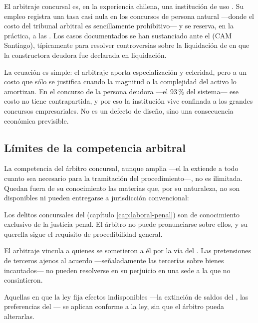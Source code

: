 El arbitraje concursal es, en la experiencia chilena, una institución de uso .
Su empleo registra una tasa casi nula en los concursos de persona natural ---donde el costo del
tribunal arbitral es sencillamente prohibitivo--- y se reserva, en la práctica, a las
. Los casos documentados se han
sustanciado ante el 
(CAM Santiago), típicamente para resolver controversias sobre la liquidación de
 en que la
constructora deudora fue declarada en liquidación.

\begin{foco}
La ecuación es simple: el arbitraje aporta especialización y celeridad, pero a un costo que sólo se
justifica cuando la magnitud o la complejidad del activo lo amortizan. En el concurso de la persona
deudora ---el 93\,\% del sistema--- ese costo no tiene contrapartida, y por eso la institución vive
confinada a los grandes concursos empresariales. No es un defecto de diseño, sino una consecuencia
económica previsible.
\end{foco}

\subsection{Límites de la competencia arbitral}

La competencia del árbitro concursal, aunque amplia ---el  la extiende a todo cuanto
sea necesario para la tramitación del procedimiento---, no es ilimitada. Quedan fuera de su
conocimiento las materias que, por su naturaleza, no son disponibles ni pueden entregarse a
jurisdicción convencional:

\begin{description}[leftmargin=0pt,style=nextline,font=\sffamily\bfseries]
  \item[La calificación penal de la insolvencia] Los delitos concursales del \cpen{}
  (capítulo \ref{cap:laboral-penal}) son de conocimiento exclusivo de la justicia penal. El
  árbitro no puede pronunciarse sobre ellos, y su querella sigue el requisito de procedibilidad
  general.

  \item[Los derechos de terceros no comparecientes] El arbitraje vincula a quienes se
  sometieron a él por la vía del . Las pretensiones de terceros ajenos al acuerdo
  ---señaladamente las tercerías sobre bienes incautados--- no pueden resolverse en su
  perjuicio en una sede a la que no consintieron.

  \item[Las materias de orden público concursal] Aquellas en que la ley fija efectos
  indisponibles ---la extinción de saldos del , las preferencias del ---
  se aplican conforme a la ley, sin que el árbitro pueda alterarlas.
\end{description}

